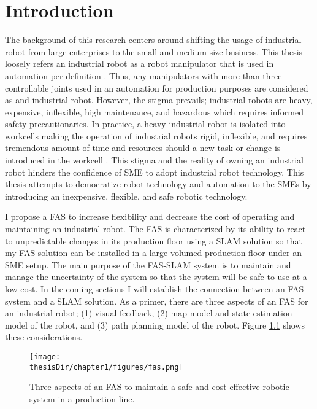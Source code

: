 

\chapter{Introduction}\label{chap:introduction}

The background of this research centers around 
shifting the usage of industrial robot 
from large enterprises to the small and medium size business. 
This thesis loosely refers an 
industrial robot as a robot manipulator that is used 
in automation per definition \textcite{iso2021}. Thus, any manipulators
with more than three controllable joints used in an automation for production purposes
are considered as and industrial robot. However, the stigma prevails;
industrial robots are heavy, expensive, inflexible, high maintenance, and hazardous 
which requires informed 
safety precautionaries. In practice, a heavy industrial robot 
is isolated into workcells 
making the operation of industrial robots rigid,
inflexible, and
requires tremendous amount of time and resources 
should a new task or change is introduced in 
the workcell \parencite{Miseikis2017}.
This stigma and the reality of owning an industrial 
robot hinders the confidence of SME
to adopt industrial robot technology. 
This thesis attempts to democratize robot 
technology and automation to the SMEs by introducing 
an inexpensive, flexible, and safe
robotic technology. 

I propose a \acrfull{FAS} to increase 
flexibility and
decrease the cost of operating and maintaining an industrial
robot. The FAS is characterized
by its ability to react to unpredictable changes in
its production floor using a SLAM solution so that
my FAS solution can be installed in a large-volumed production
floor under an SME setup. The main purpose of the FAS-SLAM 
system
is to maintain and manage the uncertainty
of the system so that the system will be safe to use 
at a low cost. 
In the coming sections I will establish the connection
between an FAS system and a SLAM solution.  
As a primer, there are three aspects of an FAS for an
industrial robot; 
(1) visual feedback, 
(2) map model and state estimation model of the robot, and 
(3) path planning model of the robot. 
Figure \ref{fig:fas} shows these considerations. 

\begin{figure}
  \centering
  \texttt{[image: \\thesisDir/chapter1/figures/fas.png]}
  \caption{Three aspects of an FAS to maintain a safe and cost effective robotic system in a production
line.}
  \label{fig:fas}
\end{figure}


